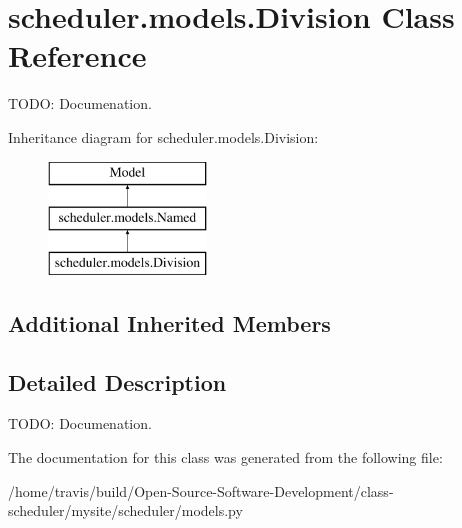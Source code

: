 \hypertarget{classscheduler_1_1models_1_1_division}{\section{scheduler.\-models.\-Division Class Reference}
\label{classscheduler_1_1models_1_1_division}
}


T\-O\-D\-O\-: Documenation.  


Inheritance diagram for scheduler.\-models.\-Division\-:\begin{figure}[H]
\begin{center}
\leavevmode
\includegraphics[height=3.000000cm]{classscheduler_1_1models_1_1_division}
\end{center}
\end{figure}
\subsection*{Additional Inherited Members}


\subsection{Detailed Description}
T\-O\-D\-O\-: Documenation. 

The documentation for this class was generated from the following file\-:\begin{DoxyCompactItemize}
\item 
/home/travis/build/\-Open-\/\-Source-\/\-Software-\/\-Development/class-\/scheduler/mysite/scheduler/models.\-py\end{DoxyCompactItemize}
